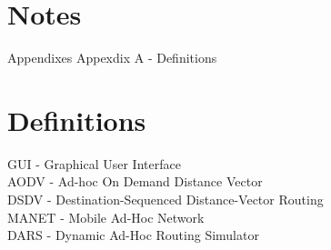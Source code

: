 \documentclass[a4paper,11pt,titlepage]{article}
\begin{document}
\section{Notes}
Appendixes
Appexdix A - Definitions

\newpage
 
\appendix
\section{Definitions}

GUI - Graphical User Interface\\
AODV - Ad-hoc On Demand Distance Vector\\
DSDV - Destination-Sequenced Distance-Vector Routing\\
MANET - Mobile Ad-Hoc Network\\
DARS - Dynamic Ad-Hoc Routing Simulator\\
\end{document}
